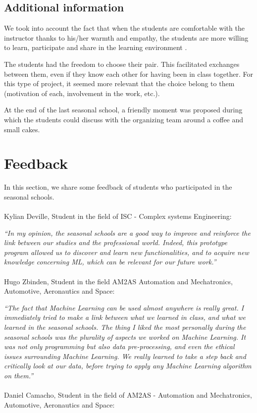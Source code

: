 \documentclass[conference]{IEEEtran}
\begin{document}
\subsection{Additional information}
We took into account the fact that when the students are comfortable with the instructor thanks to his/her warmth and empathy, the students are more willing to learn, participate and share in the learning environment \cite{b0}. 

\noindent The students had the freedom to choose their pair. This facilitated exchanges between them, even if they know each other for having been in class together. For this type of project, it seemed more relevant that the choice belong to them (motivation of each, involvement in the work, etc.).

\noindent At the end of the last seasonal school, a friendly moment was proposed during which the students could discuss with the organizing team around a coffee and small cakes.

\section{Feedback}
In this section, we share some feedback of students who participated in the seasonal schools.\\ \\
Kylian Deville, Student in the field of ISC - Complex systems Engineering:

\noindent \textit{“In my opinion, the seasonal schools are a good way to improve and reinforce the link between our studies and the professional world. Indeed, this prototype program allowed us to discover and learn new functionalities, and to acquire new knowledge concerning ML, which can be relevant for our future work.”}\\ \\
Hugo Zbinden, Student in the field AM2AS Automation and Mechatronics, Automotive, Aeronautics and Space:

\noindent \textit{“The fact that Machine Learning can be used almost anywhere is really great. I immediately tried to make a link between what we learned in class, and what we learned in the seasonal schools. The thing I liked the most personally during the seasonal schools was the plurality of aspects we worked on Machine Learning. It was not only programming but also data pre-processing, and even the ethical issues surrounding Machine Learning. We really learned to take a step back and critically look at our data, before trying to apply any Machine Learning algorithm on them.”}\\ \\
Daniel Camacho, Student in the field of AM2AS - Automation and Mechatronics, Automotive, Aeronautics and Space:
\end{document}
